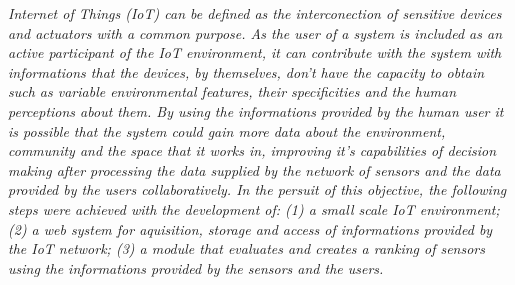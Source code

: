 \emph{
Internet of Things (IoT) can be defined as the interconection of sensitive devices and actuators with a common purpose.
As the user of a system is included as an active participant of the IoT environment, it can contribute with the system with informations that the devices, by themselves, don't have the capacity to obtain such as variable environmental features, their specificities and the human perceptions about them.
 By using the informations provided by the human user it is possible that the system could gain more data about the environment, community and the space that it works in, improving it's capabilities of decision making after processing the data supplied by the network of sensors and the data provided by the users collaboratively.
  In the persuit of this objective, the following steps were achieved with the development of: (1) a small scale IoT environment;
  (2) a web system for aquisition, storage and access of informations provided by the IoT network;
  (3) a module that evaluates and creates a ranking of sensors using the informations provided by the sensors and the users.
}
